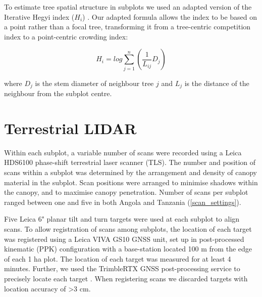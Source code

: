 \documentclass[11pt,a4paper]{article}
\newcommand{\textapprox}{\raisebox{0.5ex}{\texttildelow}}  %
\begin{document}
To estimate tree spatial structure in subplots we used an adapted version of the Iterative Hegyi index ($H_{i}$) \citep{Hegyi1974}. Our adapted formula allows the index to be based on a point rather than a focal tree, transforming it from a tree-centric competition index to a point-centric crowding index:

\begin{equation}
	H_{i} = log\sum_{j=1}^{n} (\frac{1}{L_{ij}} D_{j})
\end{equation}

where $D_{j}$ is the stem diameter of neighbour tree $j$ and $L_{j}$ is the distance of the neighbour from the subplot centre.


\section{Terrestrial LIDAR}

Within each subplot, a variable number of scans were recorded using a Leica HDS6100 phase-shift terrestrial laser scanner (TLS). The number and position of scans within a subplot was determined by the arrangement and density of canopy material in the subplot. Scan positions were arranged to minimise shadows within the canopy, and to maximise canopy penetration. Number of scans per subplot ranged between one and five in both Angola and Tanzania (\autoref{scan_settings}).

Five Leica 6" planar tilt and turn targets were used at each subplot to align scans. To allow registration of scans among subplots, the location of each target was registered using a Leica VIVA GS10 GNSS unit, set up in post-processed kinematic (PPK) configuration with a base-station located \textapprox{}100 m from the edge of each 1 ha plot. The location of each target was measured for at least 4 minutes. Further, we used the TrimbleRTX GNSS post-processing service to precisely locate each target \citep{Chen2011}. When registering scans we discarded targets with location accuracy of >3 cm.
\end{document}
